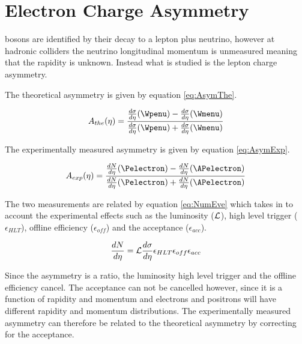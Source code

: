 \section{Electron Charge Asymmetry}


\PW bosons are identified by their decay to a lepton plus neutrino, however at
hadronic colliders the neutrino longitudinal momentum is unmeasured meaning
that the \PW rapidity is unknown. Instead what is studied is the lepton charge
asymmetry.


\cite{phenom} The theoretical asymmetry is given by equation
\ref{eq:AsymThe}.

\begin{equation}
A_{the}(\eta)=\frac{  \frac{d\sigma}{d\eta}(\Wpenu) -
\frac{d\sigma}{d\eta}(\Wmenu) }{ \frac{d\sigma}{d\eta}(\Wpenu) +
\frac{d\sigma}{d\eta}(\Wmenu) }
\label{eq:AsymThe}
\end{equation} 

The experimentally measured asymmetry is given by equation
\ref{eq:AsymExp}.\cite{kom}
 
\begin{equation}
A_{exp}(\eta)=\frac{  \frac{dN}{d\eta}(\Pelectron) -
\frac{dN}{d\eta}(\APelectron) }{ \frac{dN}{d\eta}(\Pelectron) +
\frac{dN}{d\eta}(\APelectron) }
\label{eq:AsymExp}
\end{equation} 

The two measurements are related by equation \ref{eq:NumEve} which takes in to
account the experimental effects such as the luminosity (${\cal L}$), high
level trigger ($\epsilon_{HLT}$), offline efficiency ($ \epsilon_{off}$) and
the acceptance ($\epsilon_{acc}$).

\begin{equation}
\frac{dN}{d\eta} = {\cal L } \frac{d\sigma}{d\eta}  \epsilon_{HLT}
\epsilon_{off} \epsilon_{acc}
\label{eq:NumEve}
\end{equation} 

Since the asymmetry is a ratio, the luminosity high level trigger and the
offline efficiency cancel.\cite{me} The acceptance can not be cancelled
however, since it is a function of rapidity and momentum and electrons and
positrons will have different rapidity and momentum distributions. The
experimentally measured asymmetry can therefore be related to the theoretical
asymmetry by correcting for the acceptance.\cite{me}

